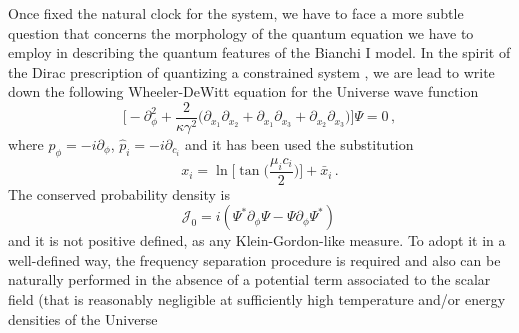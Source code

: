 \documentclass[aps,prd,twocolumn,nofootinbib,superscriptaddress]{revtex4-2}
\begin{document}
Once fixed the natural clock for the system, we have to face a more subtle question that concerns the morphology of the quantum equation we have to employ in describing the quantum features of the Bianchi I model. In the spirit of the Dirac prescription of quantizing a constrained system \cite{Dirac},
we are lead to write down the following Wheeler-DeWitt equation for the Universe wave function
\begin{equation}
\label{eqn:WDW}
\Big[-\partial_{\phi}^2+\frac{2}{\kappa\gamma^2}\Big( \partial_{x_{1}}\partial_{x_{2}}+\partial_{x_{1}}\partial_{x_{3}}+ \partial_{x_{2}}\partial_{x_{3}}\Big)\Big]\Psi=0\,,
\end{equation}
where $\hat{p}_\phi=-i\partial_\phi$, $\hat{p}_i=-i\partial_{c_i}$ and it has been used the substitution
\begin{equation}
	\label{xiS}
	x_i=\ln\bigg[{\tan\bigg({\frac{\mu_i c_i}{2}}}\bigg)\bigg]+\bar{x}_i\,.
\end{equation}
The conserved probability density is
\begin{equation}
	\mathcal{J}_0=i(\Psi^*\partial_\phi\Psi-\Psi\partial_\phi\Psi^*)\,
\end{equation}
and it is not positive defined, as any Klein-Gordon-like measure. To adopt it in a well-defined way, the frequency separation procedure is required and also can be naturally performed in the absence of a potential term associated to the scalar field (that is reasonably negligible at sufficiently high temperature and/or energy densities of the Universe
\end{document}
